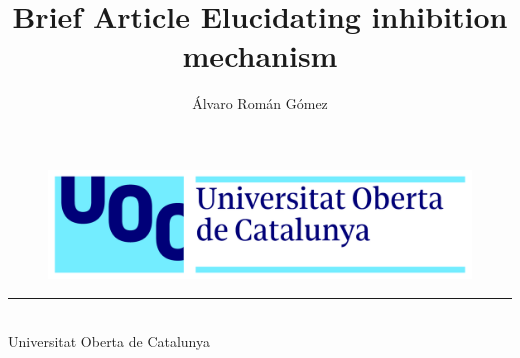 \documentclass[11pt, oneside]{article}
\title{Brief Article Elucidating inhibition mechanism}
\author{Álvaro Román Gómez}
\def\uoc{Universitat Oberta de Catalunya}
\begin{document}
\sloppy

	\begin{titlepage}
	
		\begin{center}
		\vspace*{-1in}
		\begin{figure}[H]
			\begin{center}
				\includegraphics[width=15cm]{./figures/logo_uoc}
			\end{center}
		\end{figure}
		\rule{80mm}{0.1mm}\\
		\vspace*{0.15in}
		\uoc
		
		

		\end{center}


	\end{titlepage}

\end{document}
